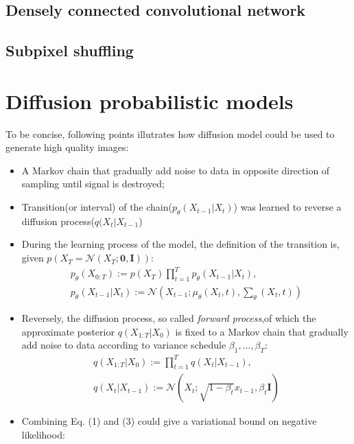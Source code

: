 \documentclass{article}
\begin{document}
\subsection{Densely connected convolutional network}
\subsection{Subpixel shuffling}
\section{Diffusion probabilistic models}
To be concise, following points illutrates how diffusion model could be used to generate high quality images:
\begin{itemize}
\item A Markov chain that gradually add noise to data in opposite direction of sampling until signal is destroyed;
\item Transition(or interval) of the chain($p_{\theta}(X_{t-1}|X_{t})$) was learned to reverse a diffusion process($q(X_{t}|X_{t-1}$)
\item During the learning process of the model, the definition of the transition is, given $p(X_{T} = \mathcal{N}(X_{T};\textbf{0},\textbf{I}))$: 
\begin{gather}
p_{\theta}(X_{0:T}) := p(X_{T})\prod_{t=1}^{T}p_{\theta}(X_{t-1}|X_{t}),\\
p_{\theta}(X_{t-1}|X_{t}) := \mathcal{N}(X_{t-1};\mu_{\theta}(X_{t},t),\sum_{\theta}(X_{t},t))
\end{gather}
\item Reversely, the diffusion process, so called \textit{forward process},of which the approximate posterior $q(X_{1:T}|X_{0})$ is fixed to a Markov chain that gradually add noise to data according to variance schedule $\beta_{1},...,\beta_{T}$:
\begin{gather}
    q(X_{1:T}|X_{0}) := \prod_{t=1}^{T}q(X_{t}|X_{t-1}),\\
    q(X_{t}|X_{t-1}) := \mathcal{N}(X_{t};\sqrt{1-\beta_{t}}x_{t-1},\beta_{t}\textbf{I})
\end{gather}
\item Combining Eq. (1) and (3) could give a variational bound on negative likelihood:
\begin{gather}
\end{gather}

\end{itemize}
\end{document}
